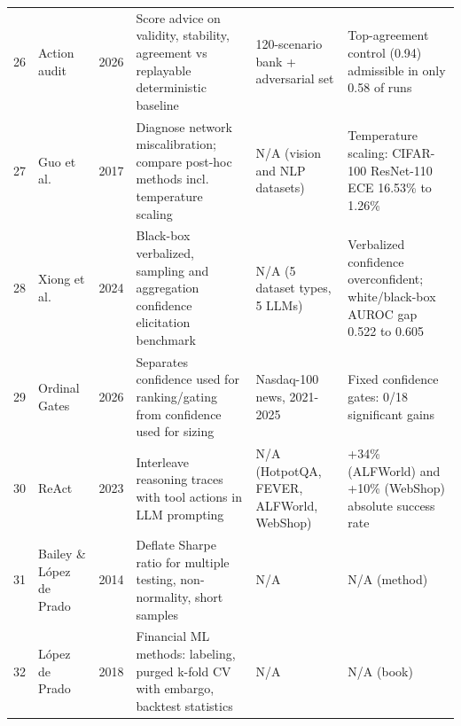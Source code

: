 \begin{table}[!p]
\begin{tabularx}{\textwidth}{r p{2.5cm} c Y p{2.6cm} Y}
26 & Action audit~\cite{actionaudit} & 2026 & Score advice on validity, stability, agreement vs replayable deterministic baseline & 120-scenario bank + adversarial set & Top-agreement control (0.94) admissible in only 0.58 of runs \\
27 & Guo et al.~\cite{guo2017calibration} & 2017 & Diagnose network miscalibration; compare post-hoc methods incl. temperature scaling & N/A (vision and NLP datasets) & Temperature scaling: CIFAR-100 ResNet-110 ECE 16.53\% to 1.26\% \\
28 & Xiong et al.~\cite{xiong2024confidence} & 2024 & Black-box verbalized, sampling and aggregation confidence elicitation benchmark & N/A (5 dataset types, 5 LLMs) & Verbalized confidence overconfident; white/black-box AUROC gap 0.522 to 0.605 \\
29 & Ordinal Gates~\cite{ordinalgates} & 2026 & Separates confidence used for ranking/gating from confidence used for sizing & Nasdaq-100 news, 2021-2025 & Fixed confidence gates: 0/18 significant gains \\
30 & ReAct~\cite{react} & 2023 & Interleave reasoning traces with tool actions in LLM prompting & N/A (HotpotQA, FEVER, ALFWorld, WebShop) & +34\% (ALFWorld) and +10\% (WebShop) absolute success rate \\
31 & Bailey \& López de Prado~\cite{bailey2014deflated} & 2014 & Deflate Sharpe ratio for multiple testing, non-normality, short samples & N/A & N/A (method) \\
32 & López de Prado~\cite{lopezdeprado2018} & 2018 & Financial ML methods: labeling, purged k-fold CV with embargo, backtest statistics & N/A & N/A (book) \\
\bottomrule
\end{tabularx}
\end{table}
